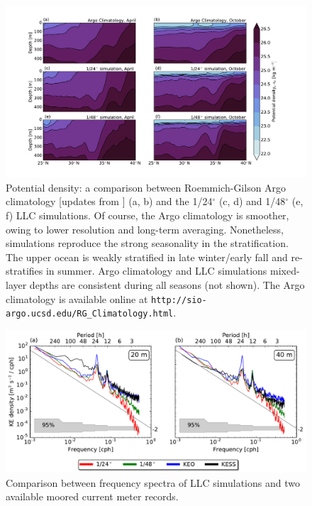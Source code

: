 \documentclass[draft,grl]{agutexSI}
\begin{document}
 \begin{figure}
    \begin{center}
      \includegraphics[width=40pc]{figs/fig_s2_1.pdf}
   \caption{Potential density: a comparison between Roemmich-Gilson Argo
           climatology [updates from \cite{roemmich_gilson2009}] (a, b) and the 1/24$^\circ$ (c, d)
           and  1/48$^\circ$ (e, f) LLC simulations. Of course, the Argo climatology is smoother,
           owing to lower resolution and long-term averaging. Nonetheless, simulations reproduce the strong
           seasonality in the stratification. The upper ocean is weakly stratified in late winter/early fall
           and re-stratifies in summer. Argo climatology and LLC simulations mixed-layer depths are consistent
            during all seasons (not shown). The Argo climatology is available online at
           \texttt{http://sio-argo.ucsd.edu/RG\_Climatology.html}.}
   \label{figS2_1}
   \end{center}
 \end{figure}

 \begin{figure}
    \begin{center}
      \includegraphics[width=40pc]{figs/figA1.pdf}
   \caption{Comparison between frequency spectra of LLC simulations and two
   available moored current meter records.}
   \label{figA1}
   \end{center}
 \end{figure}
\end{document}
